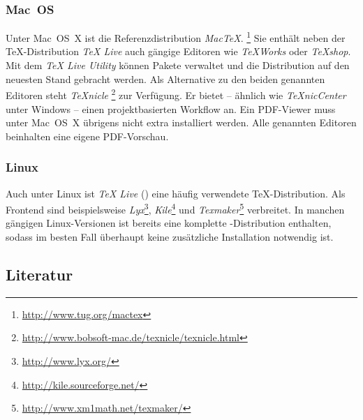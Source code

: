 \subsubsection{Mac~OS}
\label{sec:MacOs}

Unter Mac~OS~X ist die Referenzdistribution \emph{MacTeX}.%
\footnote{\url{http://www.tug.org/mactex}} 
Sie enthält neben der TeX-Distribution \emph{TeX Live} auch gängige Editoren wie \emph{TeXWorks} oder \emph{TeXshop}. Mit dem \emph{TeX Live Utility} können Pakete verwaltet und die Distribution auf den neuesten Stand gebracht werden. Als Alternative zu den beiden genannten Editoren steht \emph{TeXnicle}%
\footnote{\url{http://www.bobsoft-mac.de/texnicle/texnicle.html}} zur Verfügung. Er bietet -- ähnlich wie \emph{TeXnicCenter} unter Windows -- einen projektbasierten Workflow an.
Ein PDF-Viewer muss unter Mac~OS~X übrigens nicht extra installiert werden. Alle genannten Editoren beinhalten eine eigene PDF-Vorschau.



\subsubsection{Linux}

Auch unter Linux ist \emph{TeX Live} (\so) eine häufig verwendete TeX-Distri\-bution. 
Als Frontend sind beispielsweise
\emph{Lyx}\footnote{\url{http://www.lyx.org/}},
\emph{Kile}\footnote{\url{http://kile.sourceforge.net/}} und
\emph{Texmaker}\footnote{\url{http://www.xm1math.net/texmaker/}} 
verbreitet.
In manchen gängigen Linux-Versionen ist bereits eine komplette \latex-Distribution enthalten, sodass im besten Fall überhaupt keine zusätzliche Installation notwendig ist.  


\subsection{Literatur}
\label{sec:literatur}

